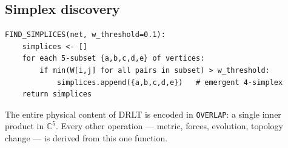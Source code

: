 \subsection{Simplex discovery}

\begin{verbatim}
FIND_SIMPLICES(net, w_threshold=0.1):
    simplices <- []
    for each 5-subset {a,b,c,d,e} of vertices:
        if min(W[i,j] for all pairs in subset) > w_threshold:
            simplices.append({a,b,c,d,e})   # emergent 4-simplex
    return simplices
\end{verbatim}

\begin{remark}
The entire physical content of DRLT is encoded in \texttt{OVERLAP}: a single inner product in $\mathbb{C}^5$. Every other operation --- metric, forces, evolution, topology change --- is derived from this one function.
\end{remark}
